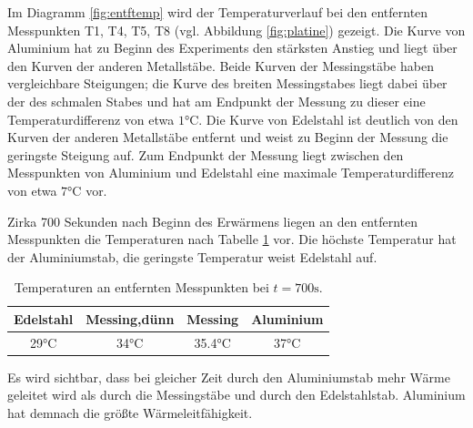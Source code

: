 Im Diagramm \ref{fig:entftemp} wird der Temperaturverlauf bei den entfernten Messpunkten T1, T4, T5, T8 (vgl. Abbildung \ref{fig:platine}) gezeigt. 
Die Kurve von Aluminium hat zu Beginn des Experiments den stärksten Anstieg und liegt über den Kurven der anderen Metallstäbe. 
Beide Kurven der Messingstäbe haben vergleichbare Steigungen;
die Kurve des breiten Messingstabes liegt dabei über der des schmalen Stabes und hat am Endpunkt der Messung zu dieser eine Temperaturdifferenz von etwa $1 \si{\degreeCelsius}$. 
Die Kurve von Edelstahl ist deutlich von den Kurven der anderen Metallstäbe entfernt und weist zu Beginn der Messung die geringste Steigung auf. 
Zum Endpunkt der Messung liegt zwischen den Messpunkten von Aluminium und Edelstahl eine maximale Temperaturdifferenz von etwa $7 \si{\degreeCelsius}$ vor. 

Zirka 700 Sekunden nach Beginn des Erwärmens liegen an den entfernten Messpunkten die Temperaturen nach Tabelle \ref{tab:700} vor. Die höchste Temperatur hat der Aluminiumstab, die geringste Temperatur weist Edelstahl auf.
\begin{table}
	\centering
	\begin{tabular}{cccc}
	\toprule
	{Edelstahl}&{Messing,dünn}&{Messing}&{Aluminium}\\
	\midrule
	29$\si{\degreeCelsius}$& 34$\si{\degreeCelsius}$& 35.4$\si{\degreeCelsius}$& 37$\si{\degreeCelsius}$\\
	\bottomrule
	\end{tabular}
	\caption{Temperaturen an entfernten Messpunkten bei $t=700\si{\second}$.}
	\label{tab:700}
\end{table}
Es wird sichtbar, dass bei gleicher Zeit durch den Aluminiumstab mehr Wärme geleitet wird als durch die Messingstäbe und durch den Edelstahlstab. 
Aluminium hat demnach die größte Wärmeleitfähigkeit.\\

